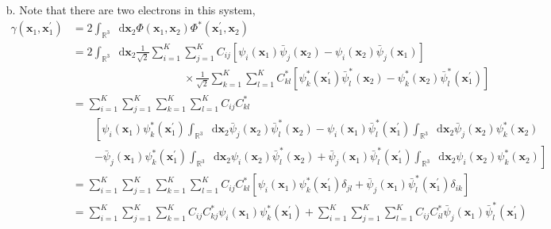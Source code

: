 \documentclass[a4paper]{book}
\newcommand*{\dif}{\mathop{}\!\mathrm{d}}
\begin{document}
\begin{solution}
\begin{enumerate}
	\item[b.] Note that there are two electrons in this system,
	\begin{align*}
		\gamma( \boldsymbol{x}_1 , \boldsymbol{x}^\prime_1 ) &= 2 \int_{ \mathbb{R}^3 } \dif \boldsymbol{x}_2 \Phi( \boldsymbol{x}_1 , \boldsymbol{x}_2 ) \Phi^*( \boldsymbol{x}^\prime_1 , \boldsymbol{x}_2 )  \\
		&= 2 \int_{ \mathbb{R}^3 } \dif \boldsymbol{x}_2 \frac{1}{ \sqrt{2} } \sum_{ i=1 }^K \sum_{ j=1 }^K C_{ij} \left[ \psi_i( \boldsymbol{x}_1 ) \bar{\psi}_j( \boldsymbol{x}_2 ) - \psi_i( \boldsymbol{x}_2 ) \bar{\psi}_j( \boldsymbol{x}_1 ) \right] \\
		&\hspace{10em} \times \frac{1}{ \sqrt{2} } \sum_{ k=1 }^K \sum_{ l=1 }^K C^*_{kl} \left[ \psi^*_k( \boldsymbol{x}^\prime_1 ) \bar{\psi}^*_l( \boldsymbol{x}_2 ) - \psi^*_k( \boldsymbol{x}_2 ) \bar{\psi}^*_l( \boldsymbol{x}^\prime_1 ) \right] \\
		&= \sum_{ i=1 }^K \sum_{ j=1 }^K \sum_{ k=1 }^K \sum_{ l=1 }^K C_{ij} C^*_{kl} \\ 
		&\hspace{2em}\left[ \psi_i( \boldsymbol{x}_1 ) \psi^*_k( \boldsymbol{x}^\prime_1 ) \int_{ \mathbb{R}^3 } \dif \boldsymbol{x}_2 \bar{\psi}_j( \boldsymbol{x}_2 ) \bar{\psi}^*_l( \boldsymbol{x}_2 ) - \psi_i( \boldsymbol{x}_1 ) \bar{\psi}^*_l( \boldsymbol{x}^\prime_1 ) \int_{ \mathbb{R}^3 } \dif \boldsymbol{x}_2 \bar{\psi}_j( \boldsymbol{x}_2 ) \psi^*_k( \boldsymbol{x}_2 ) \right. \\
		&\hspace{2em} \left. - \bar{\psi}_j( \boldsymbol{x}_1 ) \psi^*_k( \boldsymbol{x}^\prime_1 ) \int_{ \mathbb{R}^3 } \dif \boldsymbol{x}_2 \psi_i( \boldsymbol{x}_2 ) \bar{\psi}^*_l( \boldsymbol{x}_2 ) + \bar{\psi}_j( \boldsymbol{x}_1 ) \bar{\psi}^*_l( \boldsymbol{x}^\prime_1 ) \int_{ \mathbb{R}^3 } \dif \boldsymbol{x}_2 \psi_i( \boldsymbol{x}_2 ) \psi^*_k( \boldsymbol{x}_2 ) \right] \\
		&= \sum_{ i=1 }^K \sum_{ j=1 }^K \sum_{ k=1 }^K \sum_{ l=1 }^K C_{ij} C^*_{kl} \left[ \psi_i( \boldsymbol{x}_1 ) \psi^*_k( \boldsymbol{x}^\prime_1 ) \delta_{jl} + \bar{\psi}_j( \boldsymbol{x}_1 ) \bar{\psi}^*_l( \boldsymbol{x}^\prime_1 ) \delta_{ik} \right] \\
		&= \sum_{ i=1 }^K \sum_{ j=1 }^K \sum_{ k=1 }^K C_{ij} C^*_{kj} \psi_i( \boldsymbol{x}_1 ) \psi^*_k( \boldsymbol{x}^\prime_1 ) + \sum_{ i=1 }^K \sum_{ j=1 }^K \sum_{ l=1 }^K C_{ij} C^*_{il} \bar{\psi}_j( \boldsymbol{x}_1 ) \bar{\psi}^*_l( \boldsymbol{x}^\prime_1 ) \\

\end{align*}
\end{enumerate}
\end{solution}
\end{document}

